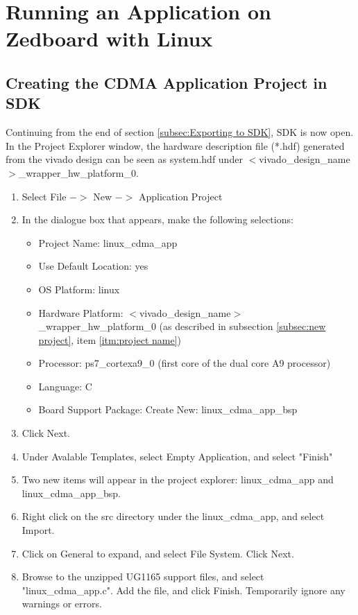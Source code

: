 \documentclass[12pt]{article}
\begin{document}
\section{Running an Application on Zedboard with Linux}

\subsection{Creating the CDMA Application Project in SDK}
\label{subsec:cdma_project}
Continuing from the end of section \ref{subsec:Exporting to SDK}, SDK is now open.  In the Project Explorer window, the hardware description file (*.hdf) generated from the vivado design can be seen as system.hdf under $<$vivado\_design\_name$>$\_wrapper\_hw\_platform\_0.
\label{par:SDK Open}

\begin{enumerate}
\item Select File $->$ New $->$ Application Project
\item In the dialogue box that appears, make the following selections:
\begin{itemize}
\item Project Name: linux\_cdma\_app
\item Use Default Location: yes
\item OS Platform: linux
\item Hardware Platform: $<$vivado\_design\_name$>$\_wrapper\_hw\_platform\_0 (as described in subsection \ref{subsec:new project}, item \ref{itm:project name})
\item Processor: ps7\_cortexa9\_0 (first core of the dual core A9 processor)
\item Language: C
\item Board Support Package: Create New: linux\_cdma\_app\_bsp
\end{itemize}
\item Click Next.
\item Under Avalable Templates, select Empty Application, and select "Finish"
\item Two new items will appear in the project explorer: linux\_cdma\_app and linux\_cdma\_app\_bsp.
\item Right click on the src directory under the linux\_cdma\_app, and select Import.
\item Click on General to expand, and select File System.  Click Next.
\item Browse to the unzipped UG1165 support files, and select "linux\_cdma\_app.c".  Add the file, and click Finish.  Temporarily ignore any warnings or errors.

\end{enumerate}
\end{document}

